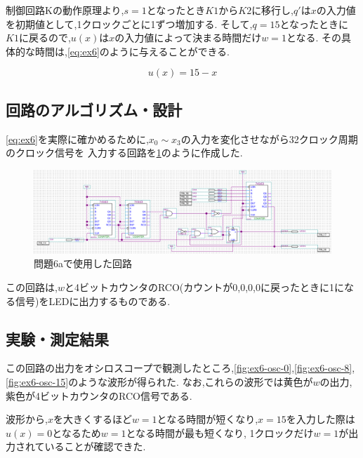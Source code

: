 \documentclass[autodetect-engine, dvi=dvipdfmx, 10pt, a4paper, ja=standard]{bxjsarticle}
\begin{document}
制御回路Kの動作原理より,$s = 1$となったとき$K1からK2$に移行し,$q'$は$x$の入力値を初期値として,1クロックごとに1ずつ増加する.
そして,$q = 15$となったときに$K1$に戻るので,$u(x)$は$x$の入力値によって決まる時間だけ$w = 1$となる.
その具体的な時間は,\ref{eq:ex6}のように与えることができる.

\begin{equation}
	\label{eq:ex6}
	u(x) = 15 - x
\end{equation}

\subsection{回路のアルゴリズム・設計}
\ref{eq:ex6}を実際に確かめるために,$x_0 \sim x_3$の入力を変化させながら32クロック周期のクロック信号を
入力する回路を\ref{fig:ex6-img}のように作成した.

\begin{figure}[htbp]
	\centering
	\includegraphics[width=\columnwidth]{asset/ex6a.png}
	\caption{問題6aで使用した回路}
	\label{fig:ex6-img}
\end{figure}

この回路は,$w$と4ビットカウンタのRCO(カウントが0,0,0,0に戻ったときに1になる信号)をLEDに出力するものである.

\subsection{実験・測定結果}

この回路の出力をオシロスコープで観測したところ,\ref{fig:ex6-osc-0},\ref{fig:ex6-osc-8},\ref{fig:ex6-osc-15}のような波形が得られた.
なお,これらの波形では黄色が$w$の出力,紫色が4ビットカウンタのRCO信号である.

波形から,$x$を大きくするほど$w = 1$となる時間が短くなり,$x = 15$を入力した際は$u(x) = 0$となるため$w = 1$となる時間が最も短くなり,
1クロックだけ$w = 1$が出力されていることが確認できた.
\end{document}
